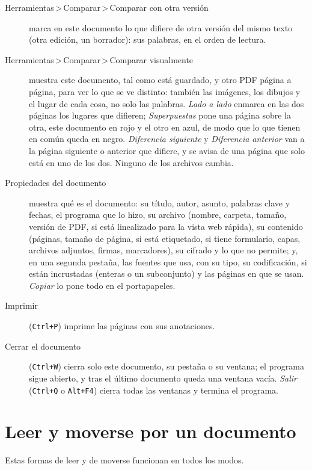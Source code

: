 \documentclass[12pt,
              article,
              oneside
              ]{memoir}
\newcommand*{\menu}[1]{\textit{#1}}
\newcommand*{\then}{\,>\,}
\newcommand*{\key}[1]{\texttt{#1}}
\begin{document}
%
\begin{description}
\item[Herramientas\then Comparar\then Comparar con otra versión] marca en este documento lo
  que difiere de otra versión del mismo texto (otra edición, un borrador):
  sus palabras, en el orden de lectura.
\item[Herramientas\then Comparar\then Comparar visualmente] muestra este documento, tal como
  está guardado, y otro PDF página a página, para ver lo que se ve
  distinto: también las imágenes, los dibujos y el lugar de cada cosa, no
  solo las palabras. \menu{Lado a lado} enmarca en las dos páginas los
  lugares que difieren; \menu{Superpuestas} pone una página sobre la otra,
  este documento en rojo y el otro en azul, de modo que lo que tienen en
  común queda en negro. \menu{Diferencia siguiente} y \menu{Diferencia
  anterior} van a la página siguiente o anterior que difiere, y se avisa
  de una página que solo está en uno de los dos. Ninguno de los archivos
  cambia.
\item[Propiedades del documento] muestra qué es el documento: su título, autor,
  asunto, palabras clave y fechas, el programa que lo hizo, su archivo
  (nombre, carpeta, tamaño, versión de PDF, si está linealizado para la
  vista web rápida), su contenido (páginas, tamaño de página, si está
  etiquetado, si tiene formulario, capas, archivos adjuntos, firmas,
  marcadores), su cifrado y lo que no permite; y, en una segunda pestaña,
  las fuentes que usa, con su tipo, su codificación, si están incrustadas
  (enteras o un subconjunto) y las páginas en que se usan. \menu{Copiar} lo
  pone todo en el portapapeles.
\item[Imprimir] (\key{Ctrl+P}) imprime las páginas con sus anotaciones.
\item[Cerrar el documento] (\key{Ctrl+W}) cierra solo este documento, su
  pestaña o su ventana; el programa sigue abierto, y tras el último documento
  queda una ventana vacía. \textup{\textit{Salir}} (\key{Ctrl+Q} o
  \key{Alt+F4}) cierra todas las ventanas y termina el programa.
\end{description}

\section{Leer y moverse por un documento}
\label{sec:reading}

%
Estas formas de leer y de moverse funcionan en todos los modos.
\end{document}
